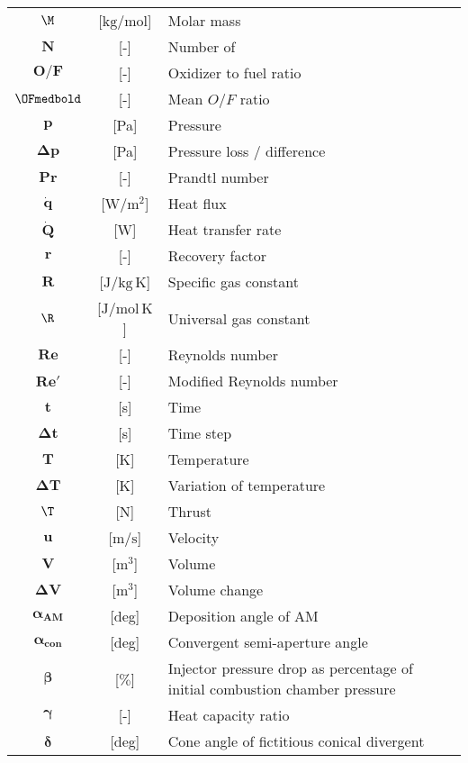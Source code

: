 \begin{multicols}{2}
{\begin{xltabular}{\linewidth}{cc>{\raggedright\arraybackslash}X}
		$\boldsymbol{\M}$ & [$\textrm{kg} / \textrm{mol}$] & Molar mass \\
		$\boldsymbol{N}$ & [-] & Number of \\
		$\boldsymbol{O/F}$ & [-] & Oxidizer to fuel ratio \\
		$\OFmedbold$ & [-] & Mean $O/F$ ratio \\ 
		$\boldsymbol{p}$ & [Pa] & Pressure \\
		$\boldsymbol{\Delta p}$ & [Pa] & Pressure loss / difference \\
		$\boldsymbol{Pr}$ & [-] & Prandtl number \\
		$\boldsymbol{\dot{q}}$ & [$\textrm{W} / \textrm{m}^2$] & Heat flux \\
		$\boldsymbol{\dot{Q}}$ & [W] & Heat transfer rate \\
		$\boldsymbol{r}$ & [-] & Recovery factor \\
		$\boldsymbol{R}$ & [$\textrm{J} / \textrm{kg} \, \textrm{K}$] & Specific gas constant \\
		$\boldsymbol{\R}$ & [$\textrm{J} / \textrm{mol} \, \textrm{K}$] & Universal gas constant \\
		$\boldsymbol{Re}$ & [-] & Reynolds number \\
		$\boldsymbol{Re'}$ & [-] & Modified Reynolds number \\
		$\boldsymbol{t}$ & [s] & Time \\
		$\boldsymbol{\Delta t}$ & [s] & Time step \\
		$\boldsymbol{T}$ & [K] & Temperature \\
		$\boldsymbol{\Delta T}$ & [K] & Variation of temperature \\
		$\boldsymbol{\T}$ & [N] & Thrust \\
		$\boldsymbol{u}$ & [$\textrm{m} / \textrm{s}$] & Velocity \\
		$\boldsymbol{V}$ & [$\textrm{m}^3$] & Volume \\
		$\boldsymbol{\Delta V}$ & [$\textrm{m}^3$] & Volume change \\
		$\boldsymbol{\alpha_{AM}}$ & [deg] & Deposition angle of AM \\
		$\boldsymbol{\alpha_{con}}$ & [deg] & Convergent semi-aperture angle \\
		$\boldsymbol{\beta}$ & [$\%$] & Injector pressure drop as percentage of initial combustion chamber pressure \\ 
		$\boldsymbol{\gamma}$ & [-] & Heat capacity ratio \\
		$\boldsymbol{\delta}$ & [deg] & Cone angle of fictitious conical divergent \\

\end{xltabular}}
\end{multicols}
